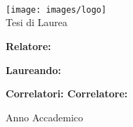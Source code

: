 %
%

\usepackage[\languages]{babel}
\usepackage[
  plainpages=false,
  pdfpagelabels,
  pdftitle={\mytitle},
  pagebackref,
  pdfauthor={\myauthor},
  pdfkeywords={\keywords}
]{hyperref}
\usepackage{memhfixc}



\title{\mytitle}
\author{\myauthor}

\ifx\mydate\undefined
\else
\date{\mydate}
\fi


\ifx\theme\undefined
\else
\usetheme{\theme}
\fi

\VerbatimFootnotes


\chapterstyle{\mychapterstyle}
\pagestyle{\mypagestyle}



\frontmatter
\thispagestyle{empty}

\noindent \begin{center}
  \textsc{\huge \university} \\
  \vspace{1.0cm}
  \textsc{\LARGE \faculty} \\
  {\large \course} \\
  \vspace{1.0cm}
  \texttt{[image: images/logo]} \\
  \vspace{0.5cm}
  {\Large Tesi di Laurea} \\
  \textbf{\huge \formattedtitle}
\end{center}

\vfill
\noindent \textbf{\Large Relatore:}

\noindent {\Large \enskip\supervisor}{\Large \hfill}\textbf{\Large Laureando:}

\noindent \textbf{\Large 
  \ifdefined\secondassistantsupervisor
    Correlatori:
  \else
    Correlatore:
  \fi
}{\Large \hfill}{\Large \myauthor\enskip}


\ifdefined\secondassistantsupervisor
  \noindent {\Large \enskip\secondassistantsupervisor}
\fi

\vfill

\noindent \begin{center}
  {\Large Anno Accademico \academicyear}
\end{center}

\clearpage

\setcounter{tocdepth}{\tocdepth}
\tableofcontents
\listoffigures


\mainmatter
